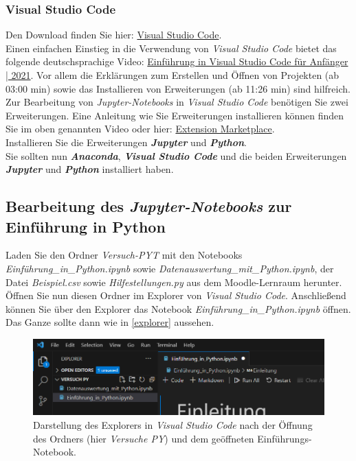 \documentclass[12pt]{scrbook}
\begin{document}
\subsubsection{Visual Studio Code}
Den Download finden Sie hier: \href{https://code.visualstudio.com/download}{Visual Studio Code}.\\
\newline
Einen einfachen Einstieg in die Verwendung von \textit{Visual Studio Code} bietet das folgende deutschsprachige Video: \href{https://www.youtube.com/watch?v=_-IDIkoo2ZA&ab_channel=FabianHiller}{Einführung in Visual Studio Code für Anfänger | 2021}. 
Vor allem die Erklärungen zum Erstellen und Öffnen von Projekten (ab 03:00 min) sowie das Installieren von Erweiterungen (ab 11:26 min) sind hilfreich.\\
\newline
Zur Bearbeitung von \textit{Jupyter-Notebooks} in \textit{Visual Studio Code} benötigen Sie zwei Erweiterungen. Eine Anleitung wie Sie Erweiterungen installieren können finden Sie im oben genannten Video oder hier: \href{https://code.visualstudio.com/docs/editor/extension-marketplace}{Extension Marketplace}.\\
Installieren Sie die Erweiterungen \textbf{\textit{Jupyter}} und \textbf{\textit{Python}}.\\
\newline
Sie sollten nun \textbf{\textit{Anaconda}}, \textbf{\textit{Visual Studio Code}} und die beiden Erweiterungen \textbf{\textit{Jupyter}} und \textbf{\textit{Python}} installiert haben.

\newpage

\subsection{Bearbeitung des \textit{Jupyter-Notebooks} zur Einführung in Python}

Laden Sie den Ordner \textit{Versuch-PYT} mit den Notebooks \textit{Einführung\_in\_Python.ipynb} sowie \textit{Datenauswertung\_mit\_Python.ipynb}, der Datei \textit{Beispiel.csv} sowie \textit{Hilfestellungen.py} aus dem Moodle-Lernraum herunter. Öffnen Sie nun diesen Ordner im Explorer von \textit{Visual Studio Code}. Anschließend können Sie über den Explorer das Notebook \textit{Einführung\_in\_Python.ipynb} öffnen. Das Ganze sollte dann wie in \autoref{explorer} aussehen.

\begin{figure}[ht]
\center
\includegraphics[scale=0.8]{Explorer_VSCode.png}
\caption{Darstellung des Explorers in \textit{Visual Studio Code} nach der Öffnung des Ordners (hier \textit{Versuche PY}) und dem geöffneten Einführungs-Notebook.}
\label{explorer}
\end{figure}
\end{document}
